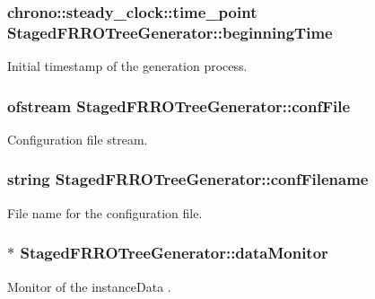 \subsubsection[{\texorpdfstring{beginning\+Time}{beginningTime}}]{\setlength{\rightskip}{0pt plus 5cm}chrono\+::steady\+\_\+clock\+::time\+\_\+point Staged\+F\+R\+R\+O\+Tree\+Generator\+::beginning\+Time\hspace{0.3cm}{\ttfamily [protected]}}\hypertarget{class_staged_f_r_r_o_tree_generator_abe0c3ffd62ab2f9915a6e09c9c31733b}{}\label{class_staged_f_r_r_o_tree_generator_abe0c3ffd62ab2f9915a6e09c9c31733b}
Initial timestamp of the generation process. 
\subsubsection[{\texorpdfstring{conf\+File}{confFile}}]{\setlength{\rightskip}{0pt plus 5cm}ofstream Staged\+F\+R\+R\+O\+Tree\+Generator\+::conf\+File\hspace{0.3cm}{\ttfamily [protected]}}\hypertarget{class_staged_f_r_r_o_tree_generator_a0f8c6801bbbd5968719911f799d66223}{}\label{class_staged_f_r_r_o_tree_generator_a0f8c6801bbbd5968719911f799d66223}
Configuration file stream. 
\subsubsection[{\texorpdfstring{conf\+Filename}{confFilename}}]{\setlength{\rightskip}{0pt plus 5cm}string Staged\+F\+R\+R\+O\+Tree\+Generator\+::conf\+Filename\hspace{0.3cm}{\ttfamily [private]}}\hypertarget{class_staged_f_r_r_o_tree_generator_a244b1c195aa8395242deeeadb3ecf657}{}\label{class_staged_f_r_r_o_tree_generator_a244b1c195aa8395242deeeadb3ecf657}
File name for the configuration file. 
\subsubsection[{\texorpdfstring{data\+Monitor}{dataMonitor}}]{$\ast$ Staged\+F\+R\+R\+O\+Tree\+Generator\+::data\+Monitor\hspace{0.3cm}{\ttfamily [private]}}\hypertarget{class_staged_f_r_r_o_tree_generator_ad8b06f3c348ba21d7a2eead895fa19c2}{}\label{class_staged_f_r_r_o_tree_generator_ad8b06f3c348ba21d7a2eead895fa19c2}
Monitor of the {\ttfamily instance\+Data} . 
